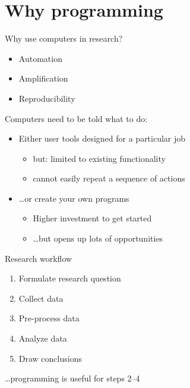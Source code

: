\documentclass[aspectratio=169,usenames,dvipsnames]{beamer}
\begin{document}
\section{Why programming}
\frame{\tableofcontents[currentsection]}


\begin{frame}
    Why use computers in research?
    \begin{itemize}
        \item Automation
        \item Amplification
        \item Reproducibility
    \end{itemize}

    \pause
    Computers need to be told what to do:

    \begin{itemize}
    \item Either user tools designed for a particular job
        \begin{itemize}
            \item but: limited to existing functionality
            \item cannot easily repeat a sequence of actions
        \end{itemize}

    \item \dots or create your own programs
        \begin{itemize}
            \item Higher investment to get started
            \item \dots but opens up lots of opportunities
        \end{itemize}
    \end{itemize}
\end{frame}


\begin{frame}{Research workflow}
    \begin{enumerate}
        \item Formulate research question
        \item Collect data
        \item Pre-process data
        \item Analyze data
        \item Draw conclusions
    \end{enumerate}

    \pause
    \dots programming is useful for steps 2--4
\end{frame}
\end{document}
